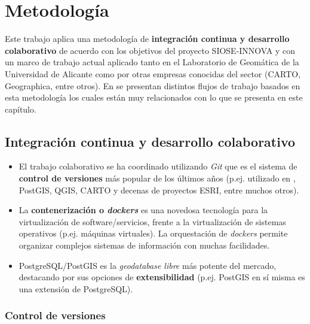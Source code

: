 

\chapter{Metodología}\label{chap:metod}

Este trabajo aplica una metodología de \textbf{integración continua y desarrollo colaborativo} de acuerdo con los objetivos del proyecto SIOSE-INNOVA y con un marco de trabajo actual aplicado tanto en el Laboratorio de Geomática de la Universidad de Alicante como por otras empresas conocidas del sector (CARTO, Geographica, entre otros). En \citet{Zaragozi2017} se presentan distintos flujos de trabajo basados en esta metodología los cuales están muy relacionados con lo que se presenta en este capítulo.


\section{Integración continua y desarrollo colaborativo}

\begin{graybox}
\begin{itemize}
\item El trabajo colaborativo se ha coordinado utilizando \textit{Git} que es el sistema de \textbf{control de versiones} más popular de los últimos años (p.ej. utilizado en , PostGIS, QGIS, CARTO y decenas de proyectos ESRI, entre muchos otros).
\item La \textbf{contenerización o \textit{dockers}} es una novedosa tecnología para la virtualización de software/servicios, frente a la virtualización de sistemas operativos (p.ej. máquinas virtuales). La orquestación de \textit{dockers} permite organizar complejos sistemas de información con muchas facilidades.
\item PostgreSQL/PostGIS es la \textit{geodatabase libre} más potente del mercado, destacando por sus opciones de \textbf{extensibilidad} (p.ej. PostGIS en sí misma es una extensión de PostgreSQL).
\end{itemize}
\end{graybox}



\subsection{Control de versiones}


